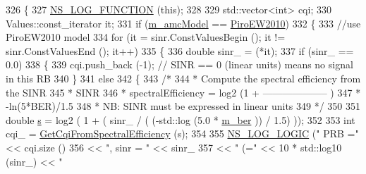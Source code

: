\begin{DoxyCode}
326 \{
327         \hyperlink{log-macros-disabled_8h_a90b90d5bad1f39cb1b64923ea94c0761}{NS\_LOG\_FUNCTION} (\textcolor{keyword}{this});
328 
329         std::vector<int> cqi;
330         Values::const\_iterator it;
331         \textcolor{keywordflow}{if} (\hyperlink{classns3_1_1MmWaveAmc_a4518d21ebad09825dd22466951c6935b}{m\_amcModel} == \hyperlink{classns3_1_1MmWaveAmc_a2805c1e6b48cb88e9cf86b062e079401aa7b0954f22ca97fa89b0d794155245d0}{PiroEW2010})
332         \{
333                 \textcolor{comment}{//use PiroEW2010 model}
334                 \textcolor{keywordflow}{for} (it = sinr.ConstValuesBegin (); it != sinr.ConstValuesEnd (); it++)
335                 \{
336                         \textcolor{keywordtype}{double} sinr\_ = (*it);
337                         \textcolor{keywordflow}{if} (sinr\_ == 0.0)
338                         \{
339                                 cqi.push\_back (-1); \textcolor{comment}{// SINR == 0 (linear units) means no signal in this RB}
340                         \}
341                         \textcolor{keywordflow}{else}
342                         \{
343                         \textcolor{comment}{/*}
344 \textcolor{comment}{                        * Compute the spectral efficiency from the SINR}
345 \textcolor{comment}{                        *                                        SINR}
346 \textcolor{comment}{                        * spectralEfficiency = log2 (1 + -------------------- )}
347 \textcolor{comment}{                        *                                    -ln(5*BER)/1.5}
348 \textcolor{comment}{                        * NB: SINR must be expressed in linear units}
349 \textcolor{comment}{                        */}
350 
351                         \textcolor{keywordtype}{double} \hyperlink{generate__test__data__lte__sinr_8m_ad83eeb3a142285d1243a08c6b7026df8}{s} = log2 ( 1 + ( sinr\_ / ( (-std::log (5.0 * 
      \hyperlink{classns3_1_1MmWaveAmc_ac0e911c1ebab08ab7c52713ea5b35a15}{m\_ber} )) / 1.5) ));
352 
353                         \textcolor{keywordtype}{int} cqi\_ = \hyperlink{classns3_1_1MmWaveAmc_acbe2e5714d389d77b25d1dfbe433a806}{GetCqiFromSpectralEfficiency} (s);
354 
355                         \hyperlink{group__logging_ga88acd260151caf2db9c0fc84997f45ce}{NS\_LOG\_LOGIC} (\textcolor{stringliteral}{" PRB ="} << cqi.size ()
356                                                                 << \textcolor{stringliteral}{", sinr = "} << sinr\_
357                                                                 << \textcolor{stringliteral}{" (="} << 10 * std::log10 (sinr\_) << \textcolor{stringliteral}{"
}
\end{DoxyCode}
